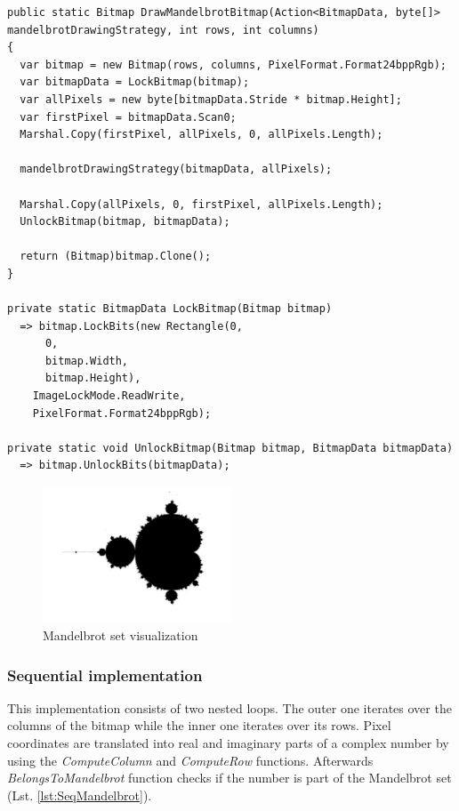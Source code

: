 \begin{lstlisting}[language={[sharp]c}, style=sharpcstyle, caption={Mandelbrot bitmap generation}, label={lst:Bitmap}]
public static Bitmap DrawMandelbrotBitmap(Action<BitmapData, byte[]> mandelbrotDrawingStrategy, int rows, int columns)
{
  var bitmap = new Bitmap(rows, columns, PixelFormat.Format24bppRgb);
  var bitmapData = LockBitmap(bitmap);
  var allPixels = new byte[bitmapData.Stride * bitmap.Height];
  var firstPixel = bitmapData.Scan0;
  Marshal.Copy(firstPixel, allPixels, 0, allPixels.Length);

  mandelbrotDrawingStrategy(bitmapData, allPixels);

  Marshal.Copy(allPixels, 0, firstPixel, allPixels.Length);
  UnlockBitmap(bitmap, bitmapData);

  return (Bitmap)bitmap.Clone();
}

private static BitmapData LockBitmap(Bitmap bitmap) 
  => bitmap.LockBits(new Rectangle(0,
      0,
      bitmap.Width,
      bitmap.Height),
    ImageLockMode.ReadWrite,
    PixelFormat.Format24bppRgb);

private static void UnlockBitmap(Bitmap bitmap, BitmapData bitmapData) 
  => bitmap.UnlockBits(bitmapData);

\end{lstlisting}

\begin{figure}[!ht]
	\centering
		\includegraphics[width = 0.5\textwidth]{figures04/MandelbrotVis.png}
	\caption{Mandelbrot set visualization}
	\label{fig:MandelbrotVis}
\end{figure}

\pagebreak
\subsubsection{Sequential implementation}
This implementation consists of two nested loops. The outer one iterates over the columns of the bitmap while the inner one iterates over its rows. 
Pixel coordinates are translated into real and imaginary parts of a complex number by using the \emph{ComputeColumn} and \emph{ComputeRow} functions. Afterwards \emph{BelongsToMandelbrot} function checks if the number is part of the Mandelbrot set (Lst. \ref{lst:SeqMandelbrot}).

